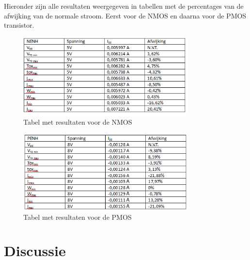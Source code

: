 \documentclass{article}
\begin{document}
Hieronder zijn alle resultaten weergegeven in tabellen met de percentages van de afwijking van de normale stroom. Eerst voor de NMOS en daarna voor de PMOS transistor.

\begin{figure}[H]
	\centering
	\includegraphics[width=0.8\textwidth]{nenhtabel}
	\caption{Tabel met resultaten voor de NMOS}
\end{figure}

\begin{figure}[H]
	\centering
	\includegraphics[width=0.8\textwidth]{penhtabel}
	\caption{Tabel met resultaten voor de PMOS}
\end{figure}

\section{Discussie}
\end{document}
